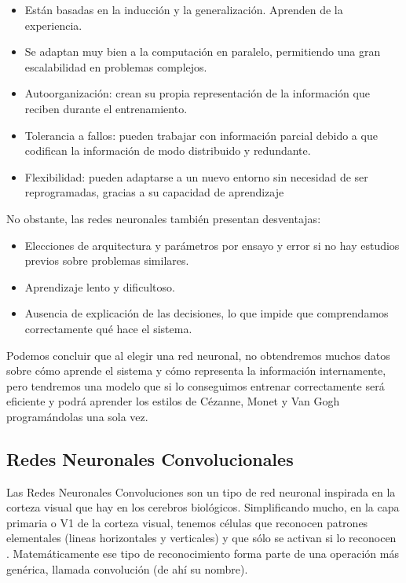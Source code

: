 \documentclass[../main.tex]{subfiles}
\begin{document}
\begin{itemize}
    \item Están basadas en la inducción y la generalización. Aprenden de la experiencia.
    \item Se adaptan muy bien a la computación en paralelo, permitiendo una gran escalabilidad en problemas complejos.
    \item Autoorganización: crean su propia representación de la información que reciben durante el entrenamiento.
    \item Tolerancia a fallos: pueden trabajar con información parcial debido a que codifican la información de modo distribuido y redundante.
    \item Flexibilidad: pueden adaptarse a un nuevo entorno sin necesidad de ser reprogramadas, gracias a su capacidad de aprendizaje
\end{itemize}

No obstante, las redes neuronales también presentan desventajas:

\begin{itemize}
    \item Elecciones de arquitectura y parámetros por ensayo y error si no hay estudios previos sobre problemas similares.
    \item Aprendizaje lento y dificultoso.
    \item Ausencia de explicación de las decisiones, lo que impide que comprendamos correctamente qué hace el sistema.
\end{itemize}

Podemos concluir que al elegir una red neuronal, no obtendremos muchos datos sobre cómo aprende el sistema y cómo representa la información internamente, pero tendremos una modelo que si lo conseguimos entrenar correctamente será eficiente y podrá aprender los estilos de Cézanne, Monet y Van Gogh programándolas una sola vez.

\subsection{Redes Neuronales Convolucionales}

Las Redes Neuronales Convoluciones son un tipo de red neuronal inspirada en la corteza visual que hay en los cerebros biológicos. Simplificando mucho, en la capa primaria o V1 de la corteza visual, tenemos células que reconocen patrones elementales (lineas horizontales y verticales) y que sólo se activan si lo reconocen \cite{Hubel1959}. Matemáticamente ese tipo de reconocimiento forma parte de una operación más genérica, llamada convolución (de ahí su nombre). \newline
\end{document}
